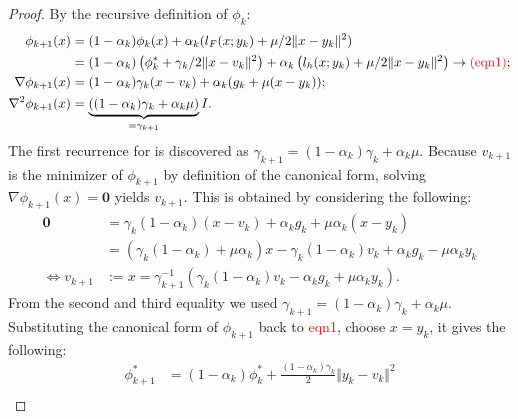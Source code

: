 \documentclass[12pt]{article}
\begin{document}
    \begin{proof}
        By the recursive definition of $\phi_k$: 
        \begin{align*}
            \phi_{k + 1}(x) 
            &= 
            (1 - \alpha_k)\phi_k(x) + \alpha_k (l_F(x; y_k) + \mu/2\Vert x - y_k\Vert^2)
            \\
            &= 
            (1 -\alpha_k)
            \left(
                \phi_k^* + \gamma_k/2\Vert x - v_k\Vert^2
            \right) 
            + 
            \alpha_k
            \left(
                l_h(x; y_k) + \mu/2\Vert x - y_k\Vert^2
            \right)
            \rightarrow \textcolor{red}{(\text{eqn1})}; 
            \\
            \nabla \phi_{k + 1}(x) 
            &= 
            (1 - \alpha_k)\gamma_k(x - v_k) + \alpha_k(g_k + \mu (x - y_k));
            \\
            \nabla^2 \phi_{k + 1}(x) &= 
            \underbrace{((1 - \alpha_k)\gamma_k + \alpha_k \mu)}_{=\gamma_{k + 1}}I. 
        \end{align*}
        The first recurrence for is discovered as $\gamma_{k + 1} = (1 - \alpha_k)\gamma_k + \alpha_k \mu$. 
        Because $v_{k + 1}$ is the minimizer of $\phi_{k+ 1}$ by definition of the canonical form, solving $\nabla \phi_{k + 1}(x) = \mathbf 0 $ yields $v_{k + 1}$. 
        This is obtained by considering the following: 
        \begin{align*}
            \mathbf 0 &= 
            \gamma_k(1 - \alpha_k)(x - v_k) + \alpha_k g_k + \mu \alpha_k(x - y_k)
            \\
            &= (\gamma_k(1 - \alpha_k) + \mu \alpha_k)x - 
            \gamma_k(1 - \alpha_k)v_k + \alpha_k g_k - \mu \alpha_k y_k
            \\
            \iff 
            v_{k + 1} &:= x=
            \gamma_{k +1}^{-1} 
            \left(
                \gamma_k(1 - \alpha_k) v_k - \alpha_k g_k + \mu \alpha_k y_k
            \right). 
        \end{align*}
        From the second and third equality we used $\gamma_{k + 1} = (1 - \alpha_k)\gamma_k + \alpha_k \mu$. 
        Substituting the canonical form of $\phi_{k + 1}$ back to \textcolor{red}{eqn1}, choose $x = y_k$, it gives the following: 
        \begin{align*}
            \phi_{k + 1}^* 
            &= (1 - \alpha_k)\phi_k^* + \frac{(1 - \alpha_k)\gamma_k}{2}\Vert y_k - v_k\Vert^2   
            \\

\end{align*}
\end{proof}
\end{document}
